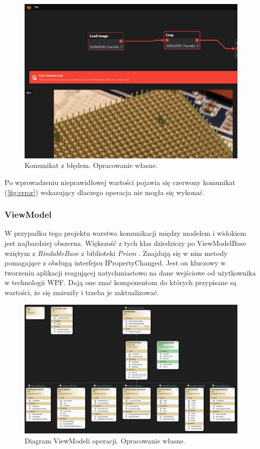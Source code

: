 \begin{figure}[H]
    \centering
    \includegraphics[width=0.8\linewidth]{images/Picture31.png}
    \caption{Komunikat z błędem. Opracowanie własne.}
    \label{fig:error}
\end{figure}

Po wprowadzeniu nieprawidłowej wartości pojawia się czerwony komunikat (\autoref{fig:error}) wskazujący dlaczego operacja nie mogła się wykonać.

\subsubsection{ViewModel}

W przypadku tego projektu warstwa komunikacji między modelem i widokiem jest najbardziej obszerna. 
Większość z tych klas dziedziczy po ViewModelBase wziętym z \textit{BindableBase} \cite{prismlibraryprism} z biblioteki \textit{Prism} \cite{prismlibrary}. 
Znajdują się w nim metody pomagające z obsługą interfejsu IPropertyChanged. 
Jest on kluczowy w tworzeniu aplikacji reagującej natychmiastowo na dane wejściowe od użytkownika w technologii WPF. 
Dają one znać komponentom do których przypisane są wartości, że się zmieniły i trzeba je zaktualizować.


\begin{figure}[H]
    \centering
    \includegraphics[width=1\linewidth]{images/Picture20.png}
    \caption{Diagram ViewModeli operacji. Opracowanie własne.}
    \label{fig:vmDiagOperation}
\end{figure}

